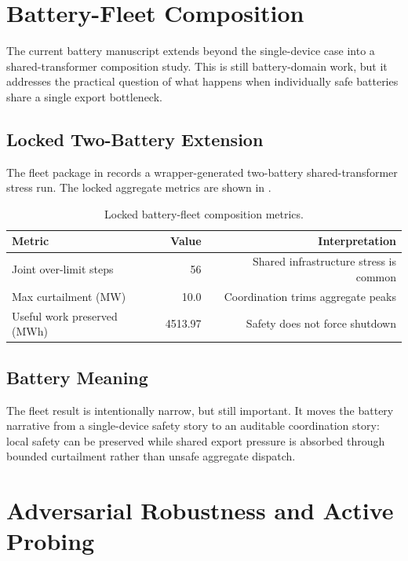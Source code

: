 \section{Battery-Fleet Composition}\label{sec:fleet_comp}

The current battery manuscript extends beyond the single-device case into a
shared-transformer composition study.  This is still battery-domain work, but
it addresses the practical question of what happens when individually safe
batteries share a single export bottleneck.

\subsection{Locked Two-Battery Extension}

The fleet package in  records a wrapper-generated
two-battery shared-transformer stress run.  The locked aggregate metrics are
shown in .

\begin{table}[htbp]
\centering\small
\caption{Locked battery-fleet composition metrics.}
\label{tab:fleet_compact}
\begin{tabular}{lrr}
\toprule
Metric & Value & Interpretation \\
\midrule
Joint over-limit steps & 56 & Shared infrastructure stress is common \\
Max curtailment (MW) & 10.0 & Coordination trims aggregate peaks \\
Useful work preserved (MWh) & 4513.97 & Safety does not force shutdown \\
\bottomrule
\end{tabular}
\end{table}

\subsection{Battery Meaning}

The fleet result is intentionally narrow, but still important.  It moves the
battery narrative from a single-device safety story to an auditable
coordination story: local safety can be preserved while shared export pressure
is absorbed through bounded curtailment rather than unsafe aggregate dispatch.

\section{Adversarial Robustness and Active Probing}\label{sec:active_probing}

